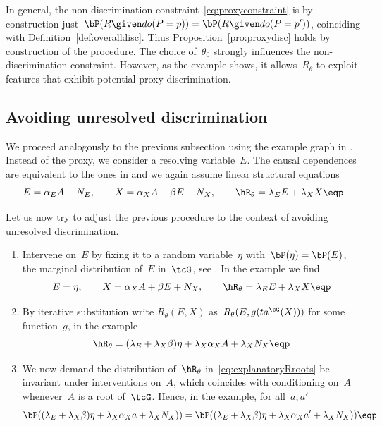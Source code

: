 In general, the non-discrimination constraint~\eqref{eq:proxyconstraint} is by
construction just~$\bP(R \given do(P=p)) = \bP(R \given do(P=p'))$, coinciding
with Definition~\ref{def:overalldisc}.  Thus Proposition~\ref{pro:proxydisc}
holds by construction of the procedure. The choice of~$\theta_0$ strongly
influences the non-discrimination constraint.  However, as the example shows, it
allows~$R_{\theta}$ to exploit features that exhibit potential proxy
discrimination.

\subsection{Avoiding unresolved discrimination}
\label{subsec:unexplaineddiscrimination}

We proceed analogously to the previous subsection using the example graph in
. Instead of the proxy, we consider a resolving
variable~$E$. The causal dependences are equivalent to the ones in
 and we again assume linear structural equations
\begin{equation*}
  E = \alpha_E A + N_E, \qquad
  X = \alpha_X A + \beta E + N_X, \qquad
  \hR_{\theta} = \lambda_E E + \lambda_X X \eqp
\end{equation*}

Let us now try to adjust the previous procedure to the context of avoiding
unresolved discrimination.

\begin{enumerate}
  \item Intervene on~$E$ by fixing it to a random variable~$\eta$
    with~$\bP(\eta) = \bP(E)$, the marginal distribution of~$E$ in~$\tcG$, see
    . In the example we find
    \begin{align} \label{eq:explanatoryR}
      E = \eta, \qquad
      X = \alpha_X A + \beta E + N_X, \qquad
      \hR_{\theta} = \lambda_E E + \lambda_X X \eqp
    \end{align}
  \item By iterative substitution write $R_{\theta}(E, X)$ as~$R_{\theta}(E,
    g(ta^{\cG}(X)))$ for some function~$g$, \ie{} in the example
    \begin{equation}\label{eq:explanatoryRroots}
      \hR_{\theta} = (\lambda_E + \lambda_X \beta) \eta + \lambda_X \alpha_X A + \lambda_X N_X \eqp
    \end{equation}
  \item We now demand the distribution of~$\hR_{\theta}$
    in~\eqref{eq:explanatoryRroots} be invariant under interventions on~$A$,
    which coincides with conditioning on~$A$ whenever~$A$ is a root of~$\tcG$.
    Hence, in the example, for all~$a, a'$
    \begin{equation}\label{eq:explanatoryconstraint}
      \bP((\lambda_E + \lambda_X \beta) \eta + \lambda_X \alpha_X a + \lambda_X N_X)) =
      \bP((\lambda_E + \lambda_X \beta) \eta + \lambda_X \alpha_X a' + \lambda_X N_X)) \eqp
    \end{equation}
\end{enumerate}

